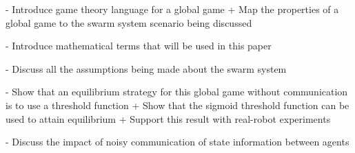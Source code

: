 \documentclass[conference]{IEEETran}
\begin{document}
- Introduce game theory language for a global game
  + Map the properties of a global game to the swarm system scenario being discussed

- Introduce mathematical terms that will be used in this paper

- Discuss all the assumptions being made about the swarm system

- Show that an equilibrium strategy for this global game without communication is to use a threshold function
  + Show that the sigmoid threshold function can be used to attain equilibrium
  + Support this result with real-robot experiments
  
- Discuss the impact of noisy communication of state information between agents  


\end{document}
